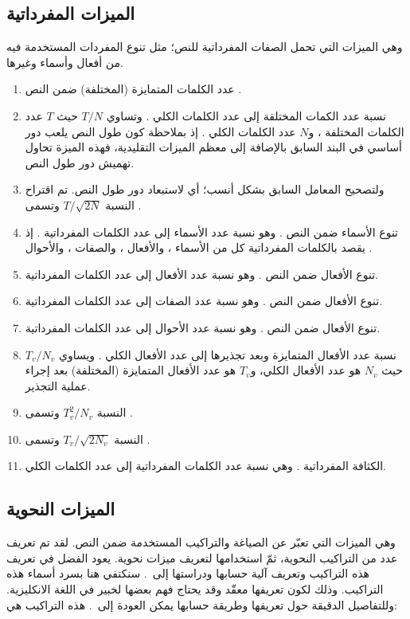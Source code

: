 \subsection{الميزات المفرداتية }
وهي الميزات التي تحمل الصفات المفرداتية للنص؛
مثل تنوع المفردات المستخدمة فيه من أفعال وأسماء وغيرها.
\begin{enumerate}[resume]
	\item 
	عدد الكلمات المتمايزة (المختلفة) ضمن النص .
	\item 
	نسبة عدد الكمات المختلفة إلى عدد الكلمات الكلي .
	وتساوي $T/N$ حيث $T$ عدد الكلمات المختلفة ،
	و$N$ عدد الكلمات الكلي .
	إذ بملاحظة كون طول النص يلعب دور أساسي في البند السابق بالإضافة إلى معظم الميزات التقليدية،
	فهذه الميزة تحاول تهميش دور طول النص.
	\item 
	ولتصحيح المعامل السابق بشكل أنسب؛ أي لاستبعاد دور طول النص.
	تم اقتراح النسبة $T/\sqrt{2N}$ وتسمى .
	\item 
	تنوع الأسماء ضمن النص .
	وهو نسبة عدد الأسماء إلى عدد الكلمات المفرداتية .
	إذ يقصد بالكلمات المفرداتية كل من الأسماء ، والأفعال ،
	والصفات ، والأحوال .
	\item 
	تنوع الأفعال ضمن النص .
	وهو نسبة عدد الأفعال إلى عدد الكلمات المفرداتية.
	\item 
	تنوع الأفعال ضمن النص .
	وهو نسبة عدد الصفات إلى عدد الكلمات المفرداتية.
	\item 
	تنوع الأفعال ضمن النص .
	وهو نسبة عدد الأحوال إلى عدد الكلمات المفرداتية.
	\item 
	نسبة عدد الأفعال المتمايزة وبعد تجذيرها إلى عدد الأفعال الكلي .
	ويساوي $T_v/N_v$ حيث $N_v$ هو عدد الأفعال الكلي،
	و$T_v$ هو عدد الأفعال المتمايزة (المختلفة) بعد إجراء عملية التجذير.
	\item 
	النسبة $T_v^2/N_v$ وتسمى .
	\item 
	النسبة $T_v/\sqrt{2N_v}$ وتسمى .
	\item 
	الكثافة المفرداتية .
	وهي نسبة عدد الكلمات المفرداتية إلى عدد الكلمات الكلي.
\end{enumerate}



\subsection{الميزات النحوية }
وهي الميزات التي تعبّر عن الصياغة والتراكيب المستخدمة ضمن النص.
لقد تم تعريف عدد من التراكيب النحوية، ثمّ استخدامها لتعريف ميزات نحوية.
يعود الفضل في تعريف هذه التراكيب وتعريف آلية حسابها ودراستها إلى~\cite{lu2010}.
سنكتفي هنا بسرد أسماء هذه التراكيب.
وذلك لكون تعريفها معقّد وقد يحتاج فهم بعضها لخبير في اللغة الانكليزية.
وللتفاصيل الدقيقة حول تعريفها وطريقة حسابها يمكن العودة إلى~\cite{lu2010}.
هذه التراكيب هي:

